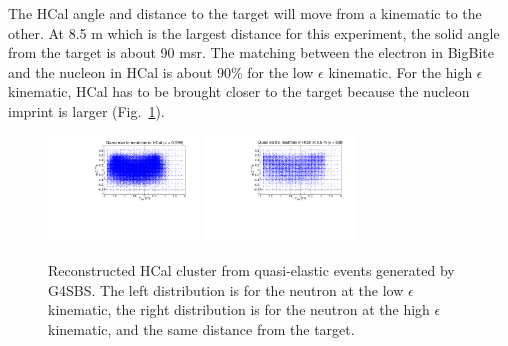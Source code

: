 
The HCal angle and distance to the target will move from a kinematic to the other. At 8.5 m which is the largest distance for this experiment, the solid angle from the target is about 90 msr.
The matching between the electron in BigBite and the nucleon in HCal is about 90\% for the low $\epsilon$ kinematic.
For the high $\epsilon$ kinematic, HCal has to be brought closer to the target because the nucleon imprint is larger (Fig.~\ref{fig:hcal_nuclimprint2}).
%
\begin{figure}[!h]
  \begin{center}
    \includegraphics[angle=90,width=4cm]{Plots/HCal_n.pdf}
    \includegraphics[angle=90,width=4cm]{Plots/HCal_n_he.pdf}
    \caption{Reconstructed HCal cluster from quasi-elastic events generated by G4SBS. The left distribution is for the neutron at the low $\epsilon$ kinematic, the right distribution is for the neutron at the high $\epsilon$ kinematic, and the same distance from the target.}
    \label{fig:hcal_nuclimprint2}
  \end{center}
\end{figure}
%



